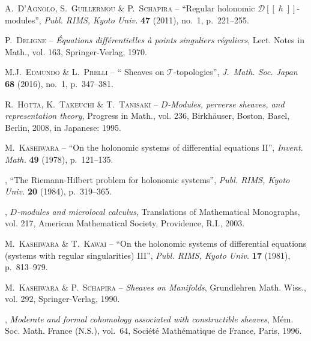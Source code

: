 \documentclass[english]{smfart}
\numberwithin{subsection}{section}
\numberwithin{equation}{section}
\theoremstyle{plain}
\theoremstyle{definition}
\begin{document}
\backmatter
\providecommand{\eprint}[1]{\href{http://arxiv.org/abs/#1}{\texttt{arXiv\string:\allowbreak#1}}}\providecommand{\doi}[1]{\href{http://dx.doi.org/#1}{\texttt{doi\string:\allowbreak#1}}}
\providecommand{\og}{``}
\providecommand{\fg}{''}
\providecommand{\smfandname}{\&}
\begin{thebibliography}{10}

{\scshape A.~D'Agnolo, S.~Guillermou {\normalfont \smfandname} P.~Schapira} --
  {\og Regular holonomic {$\mathcal D[\![\hslash]\!]$}-modules\fg}, \emph{Publ.
  RIMS, Kyoto Univ.} \textbf{47} (2011), no.~1, p.~221--255.

{\scshape P.~Deligne} -- \emph{Équations diff{\'e}rentielles {\`a} points
  singuliers r{\'e}guliers}, Lect. Notes in Math., vol. 163, Springer-Verlag,
  1970.

{\scshape {\relax M.J}.~Edmundo {\normalfont \smfandname} L.~Prelli} -- {\og
  Sheaves on {$\mathcal{T}$}-topologies\fg}, \emph{J.~Math. Soc. Japan}
  \textbf{68} (2016), no.~1, p.~347--381.

{\scshape R.~Hotta, K.~Takeuchi {\normalfont \smfandname} T.~Tanisaki} --
  \emph{{$D$-Modules, perverse sheaves, and representation theory}}, Progress
  in Math., vol. 236, Birkh{\"a}user, Boston, Basel, Berlin, 2008, in Japanese:
  1995.

{\scshape M.~Kashiwara} -- {\og {On the holonomic systems of differential
  equations II}\fg}, \emph{Invent. Math.} \textbf{49} (1978), p.~121--135.

\bysame , {\og The {Riemann-Hilbert} problem for holonomic systems\fg},
  \emph{Publ. RIMS, Kyoto Univ.} \textbf{20} (1984), p.~319--365.

\bysame , \emph{{$D$}-modules and microlocal calculus}, Translations of
  Mathematical Monographs, vol. 217, American Mathematical Society, Providence,
  R.I., 2003.

{\scshape M.~Kashiwara {\normalfont \smfandname} T.~Kawai} -- {\og {On the
  holonomic systems of differential equations (systems with regular
  singularities) III}\fg}, \emph{Publ. RIMS, Kyoto Univ.} \textbf{17} (1981),
  p.~813--979.

{\scshape M.~Kashiwara {\normalfont \smfandname} P.~Schapira} -- \emph{{Sheaves
  on Manifolds}}, Grundlehren Math. Wiss., vol. 292, Springer-Verlag, 1990.

\bysame , \emph{Moderate and formal cohomology associated with constructible
  sheaves}, M{\'e}m. Soc. Math. France (N.S.), vol.~64, Soci{\'e}t{\'e}
  Math{\'e}matique de France, Paris, 1996.


\end{thebibliography}
\end{document}
